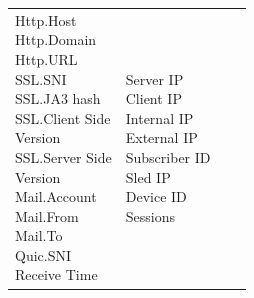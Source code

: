 \begin{description}
\begin{longtable}{p{}|p{}|p{}|p{}}
{                                                                        Http.Host\\
                                                                        Http.Domain\\
                                                                        Http.URL\\
                                                                        SSL.SNI\\
                                                                        SSL.JA3 hash\\
                                                                        SSL.Client Side\\ Version\\
                                                                        SSL.Server Side\\ Version\\
                                                                        Mail.Account\\
                                                                        Mail.From\\
                                                                        Mail.To\\
                                                                        Quic.SNI\\
                                                                        Receive Time} & \tabincell{l}{Server IP\\
                                                                                                    Client IP\\
                                                                                                    Internal IP\\
                                                                                                    External IP\\
                                                                                                    Subscriber ID\\
                                                                                                    Sled IP\\
                                                                                                    Device ID\\
                                                                                                    Sessions\\
}
\end{longtable}
\end{description}
